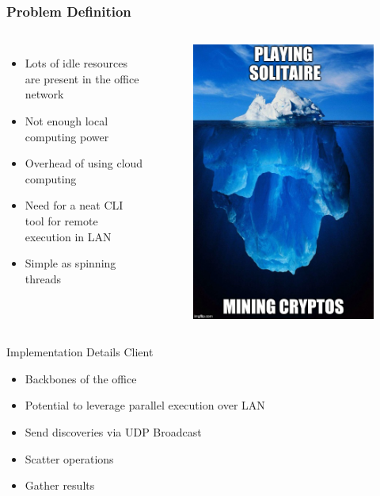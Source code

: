 \documentclass{beamer}
\begin{document}
\begin{frame}
\frametitle{Problem Definition}
\begin{columns}[c]
\begin{itemize}
\item Lots of idle resources are present in the office network 
\item Not enough local computing power 
\item Overhead of using cloud computing 
\item Need for a neat CLI tool for remote execution in LAN 
\item Simple as spinning threads
\end{itemize}
\begin{figure}
    \centering
    \includegraphics[width=0.75\linewidth]{iceberg.jpeg}
\end{figure}
\end{columns}
\end{frame}

\begin{frame}{Implementation Details}
\quad Client\\
\begin{itemize}
    \item Backbones of the office
    \item Potential to leverage parallel execution over LAN
    \item Send discoveries via UDP Broadcast
    \item Scatter operations
    \item Gather results
\end{itemize}
\end{frame}
\end{document}
